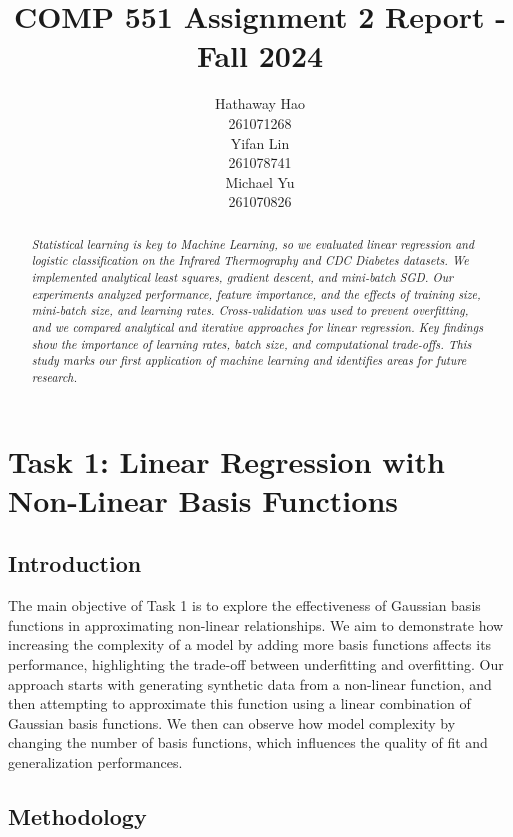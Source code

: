 \documentclass{article}
\title{COMP 551 Assignment 2 Report - Fall 2024}
\author{
 Hathaway Hao \\
  261071268\\
   \And
 Yifan Lin \\
  261078741\\
  \And
 Michael Yu \\
  261070826\\
}
\begin{document}
\maketitle
\begin{abstract}
\textit {Statistical learning is key to Machine Learning, so we evaluated linear regression and logistic classification on the Infrared Thermography and CDC Diabetes datasets. We implemented analytical least squares, gradient descent, and mini-batch SGD. Our experiments analyzed performance, feature importance, and the effects of training size, mini-batch size, and learning rates. Cross-validation was used to prevent overfitting, and we compared analytical and iterative approaches for linear regression. Key findings show the importance of learning rates, batch size, and computational trade-offs. This study marks our first application of machine learning and identifies areas for future research.}

\end{abstract}



\section{Task 1: Linear Regression with Non-Linear Basis Functions}
\subsection{Introduction}
The main objective of Task 1 is to explore the effectiveness of Gaussian basis functions in approximating non-linear relationships. We aim to demonstrate how increasing the complexity of a model by adding more basis functions affects its performance, highlighting the trade-off between underfitting and overfitting. Our approach starts with generating synthetic data from a non-linear function, and then attempting to approximate this function using a linear combination of Gaussian basis functions. We then can observe how model complexity by changing the number of basis functions, which influences the quality of fit and generalization performances.

\subsection{Methodology}
\end{document}
